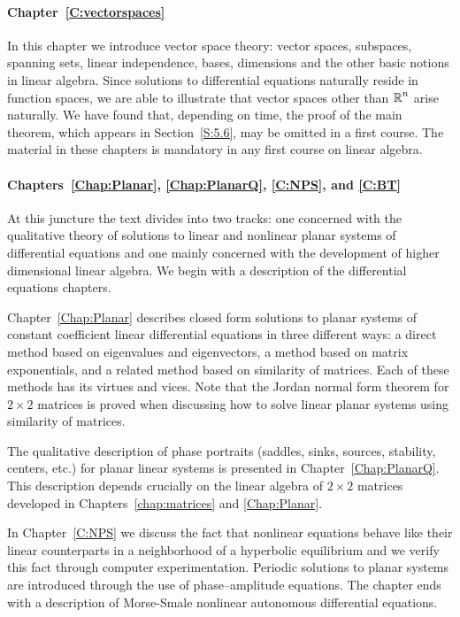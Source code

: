 \documentclass{ximera}
\begin{document}
\paragraph{Chapter~\ref{C:vectorspaces}} In this chapter we introduce vector 
space theory: vector spaces, subspaces, spanning sets, linear independence, 
bases, dimensions and the other basic notions in linear algebra.  Since 
solutions to differential equations naturally reside in function spaces, we 
are able to illustrate that vector spaces other than $\mbox{$\Bbb{R}$}^n$ arise naturally.  
We have found that, depending on time, the proof of the main theorem, which 
appears in Section~\ref{S:5.6}, may be omitted in a first course.  The 
material in these chapters is mandatory in any first course on linear algebra.

\paragraph{Chapters~\ref{Chap:Planar}, \ref{Chap:PlanarQ}, \ref{C:NPS}, and 
\ref{C:BT}}  At this juncture the text divides into two tracks: one concerned 
with the qualitative theory of solutions to linear and nonlinear planar 
systems of differential equations and one mainly concerned with the 
development of higher dimensional linear algebra.  We begin with a 
description of the differential equations chapters.

Chapter~\ref{Chap:Planar} describes closed form solutions to planar systems 
of constant coefficient linear differential equations in three different
ways: a direct method based on eigenvalues and eigenvectors, a method based
on matrix exponentials, and a related method based on similarity of matrices.
Each of these methods has its virtues and vices.  Note that the Jordan normal 
form theorem for $2\times 2$ matrices is proved when discussing how to solve 
linear planar systems using similarity of matrices.

The qualitative description of phase portraits (saddles, sinks, sources,
stability, centers, etc.) for planar linear systems is presented in 
Chapter~\ref{Chap:PlanarQ}.  This description depends crucially on the linear 
algebra of $2\times 2$ matrices developed in Chapters~\ref{chap:matrices} 
and \ref{Chap:Planar}.

In Chapter~\ref{C:NPS} we discuss the fact that nonlinear equations behave 
like their linear counterparts in a neighborhood of a hyperbolic equilibrium 
and we verify this fact through computer experimentation.  Periodic solutions 
to planar systems are introduced through the use of phase--amplitude 
equations.  The chapter ends with a description of Morse-Smale nonlinear 
autonomous differential equations.  
\end{document}
